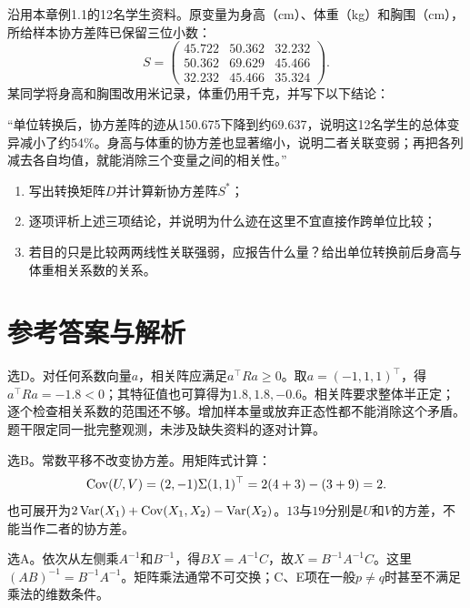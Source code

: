 沿用本章例1.1的12名学生资料。原变量为身高（cm）、体重（kg）和胸围（cm），所给样本协方差阵已保留三位小数：
\[
S=\begin{pmatrix}45.722&50.362&32.232\\50.362&69.629&45.466\\32.232&45.466&35.324\end{pmatrix}.
\]
某同学将身高和胸围改用米记录，体重仍用千克，并写下以下结论：

“单位转换后，协方差阵的迹从150.675下降到约69.637，说明这12名学生的总体变异减小了约54\%。身高与体重的协方差也显著缩小，说明二者关联变弱；再把各列减去各自均值，就能消除三个变量之间的相关性。”

\begin{enumerate}[label=（\arabic*）]
\item 写出转换矩阵$D$并计算新协方差阵$S^*$；
\item 逐项评析上述三项结论，并说明为什么迹在这里不宜直接作跨单位比较；
\item 若目的只是比较两两线性关联强弱，应报告什么量？给出单位转换前后身高与体重相关系数的关系。
\end{enumerate}

\clearpage
\section{参考答案与解析}
选D。对任何系数向量$a$，相关阵应满足$a^\top Ra\geq0$。取$a=(-1,1,1)^\top$，得$a^\top Ra=-1.8<0$；其特征值也可算得为$1.8,1.8,-0.6$。相关阵要求整体半正定；逐个检查相关系数的范围还不够。增加样本量或放弃正态性都不能消除这个矛盾。题干限定同一批完整观测，未涉及缺失资料的逐对计算。
\par\nobreak\smallskip{}

选B。常数平移不改变协方差。用矩阵式计算：
\[
\operatorname{Cov}(U,V)=(2,-1)\Sigma(1,1)^\top=2(4+3)-(3+9)=2.
\]
也可展开为$2\operatorname{Var}(X_1)+\operatorname{Cov}(X_1,X_2)-\operatorname{Var}(X_2)$。$13$与$19$分别是$U$和$V$的方差，不能当作二者的协方差。
\par\nobreak\smallskip{}

选A。依次从左侧乘$A^{-1}$和$B^{-1}$，得$BX=A^{-1}C$，故$X=B^{-1}A^{-1}C$。这里$(AB)^{-1}=B^{-1}A^{-1}$。矩阵乘法通常不可交换；C、E项在一般$p\ne q$时甚至不满足乘法的维数条件。
\par\nobreak\smallskip{}


